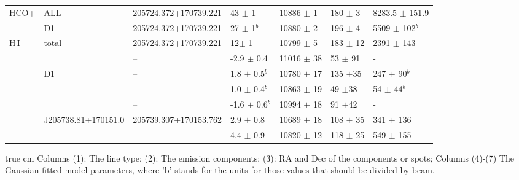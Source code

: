 \documentclass[]{aa} %
\newcommand{\HI}{{\rm H\,{\scriptsize I}}\xspace}
\begin{document}
\begin{table*}
\begin{tabular}{lllllll}
\hline
HCO+
&ALL           & 205724.372+170739.221  & 43 $\pm$ 1    & 10886 $\pm$ 1    & 180 $\pm$ 3   & 8283.5 $\pm$ 151.9     \\
&D1            & 205724.372+170739.221  & 27 $\pm$ 1$^{b}$    & 10880 $\pm$ 2    & 196 $\pm$ 4   & 5509 $\pm$ 102$^{b}$     \\
\hline
\HI
&  total      & 205724.372+170739.221   & 12$\pm$ 1      & 10799 $\pm$ 5     & 183 $\pm$ 12      & 2391 $\pm$ 143   \\%
&             & --                      & -2.9 $\pm$ 0.4      & 11016 $\pm$ 38    & 53 $\pm$ 91      &- \\ %

&D1           & --                      &  1.8 $\pm$ 0.5$^{b}$       & 10780 $\pm$ 17      & 135 $\pm$35      & 247 $\pm$ 90$^{b}$  \\
&             & --                      &  1.0 $\pm$ 0.4$^{b}$       & 10863 $\pm$ 19      & 49  $\pm$38      & 54 $\pm$ 44$^{b}$  \\
&             & --                      & -1.6 $\pm$ 0.6$^{b}$       & 10994 $\pm$ 18      & 91  $\pm$42      &-\\ %
&J205738.81+170151.0 %
                     & 205739.307+170153.762                           &  2.9 $\pm$ 0.8         & 10689 $\pm$ 18   & 108 $\pm$ 35     & 341 $\pm$ 136   \\
           &          & --                           &  4.4 $\pm$ 0.9         & 10820 $\pm$ 12   & 118 $\pm$ 25     & 549 $\pm$ 155   \\
 \hline

\hline
\end{tabular}
 true cm \noindent Columns (1): The line type; (2): The emission components; (3): RA and Dec of the components or spots; Columns (4)-(7) The Gaussian fitted model parameters, where 'b' stands for the units for those values that should be divided by beam.
\end{table*}
\end{document}
